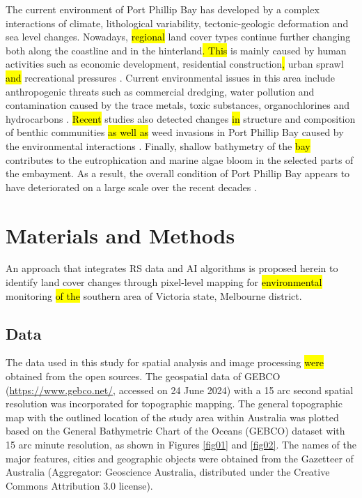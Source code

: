 \documentclass[jmse,article,submit,pdftex,moreauthors]{Definitions/mdpi}
\begin{document}
The current environment of Port Phillip Bay has developed by a complex interactions of climate, lithological variability, tectonic-geologic deformation and sea level changes. Nowadays, \hl{regional} land cover types\hl{ }continue further changing both along the coastline and in the hinterland\hl{. This} is mainly caused by human activities such as economic development, residential construction\hl{, }urban sprawl \hl{and} recreational pressures \cite{FultonSmith}. Current environmental issues in this area include anthropogenic threats such as commercial dredging, water pollution and contamination caused by the trace metals, toxic substances, organochlorines and hydrocarbons \cite{PHILLIPS1992200}. \hl{Recent} studies also detected changes \hl{in} structure and composition of benthic communities \hl{as well as} weed invasions in Port Phillip Bay caused by the environmental interactions \cite{CURRIE199936}. Finally, shallow bathymetry of the \hl{bay} contributes to the eutrophication \cite{FultonSmith} and marine algae bloom \cite{md18030142,976565} in the selected parts of the embayment. As a result, the overall condition of Port Phillip Bay appears to have deteriorated on a large scale over the recent decades \cite{JUNG201193}.

\section{Materials and Methods}

An approach that integrates RS data and AI algorithms is proposed herein to identify land cover changes through pixel-level mapping for \hl{environmental }monitoring\hl{ of the }southern area of Victoria state, Melbourne district. 

\subsection{Data}

The data used in this study for spatial analysis and image processing \hl{were} obtained from the open sources. The geospatial data of GEBCO (\href{https://www.gebco.net/}{https://www.gebco.net/}, accessed on 24 June 2024) with a 15 arc second spatial resolution was incorporated for topographic mapping. The general topographic map with the outlined location of the study area within Australia was plotted based on the General Bathymetric Chart of the Oceans (GEBCO) dataset with 15 arc minute resolution, as shown in Figures \ref{fig01} and \ref{fig02}. The names of the major features, cities and geographic objects were obtained from the Gazetteer of Australia (Aggregator: Geoscience Australia, distributed under the Creative Commons Attribution 3.0 license). 
\end{document}
